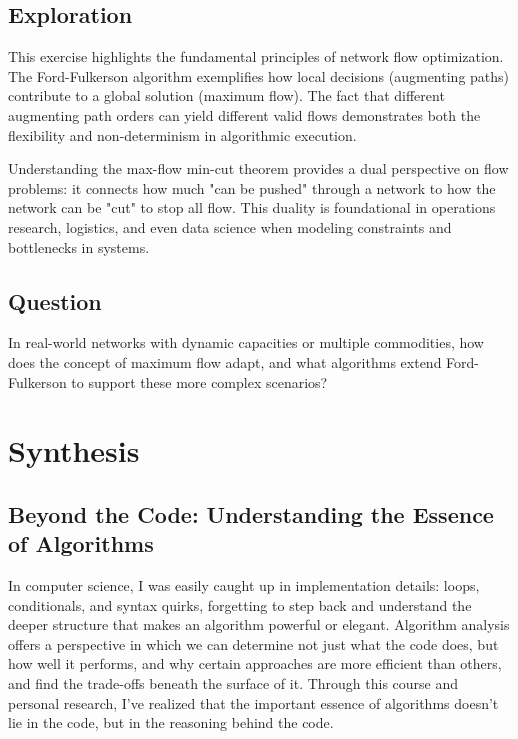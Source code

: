 \documentclass[11pt]{article}
\begin{document}
\subsection{Exploration}

This exercise highlights the fundamental principles of network flow optimization. The Ford-Fulkerson algorithm exemplifies how local decisions (augmenting paths) contribute to a global solution (maximum flow). The fact that different augmenting path orders can yield different valid flows demonstrates both the flexibility and non-determinism in algorithmic execution. 

Understanding the max-flow min-cut theorem provides a dual perspective on flow problems: it connects how much "can be pushed" through a network to how the network can be "cut" to stop all flow. This duality is foundational in operations research, logistics, and even data science when modeling constraints and bottlenecks in systems.

\subsection{Question}

In real-world networks with dynamic capacities or multiple commodities, how does the concept of maximum flow adapt, and what algorithms extend Ford-Fulkerson to support these more complex scenarios?

\newpage

\section{Synthesis}
\subsection*{Beyond the Code: Understanding the Essence of Algorithms}

In computer science, I was easily caught up in implementation details: loops, conditionals, and syntax quirks, forgetting to step back and understand the deeper structure that makes an algorithm powerful or elegant. Algorithm analysis offers a perspective in which we can determine not just what the code does, but how well it performs, and why certain approaches are more efficient than others, and find the trade-offs beneath the surface of it. Through this course and personal research, I’ve realized that the important essence of algorithms doesn’t lie in the code, but in the reasoning behind the code.
\end{document}
